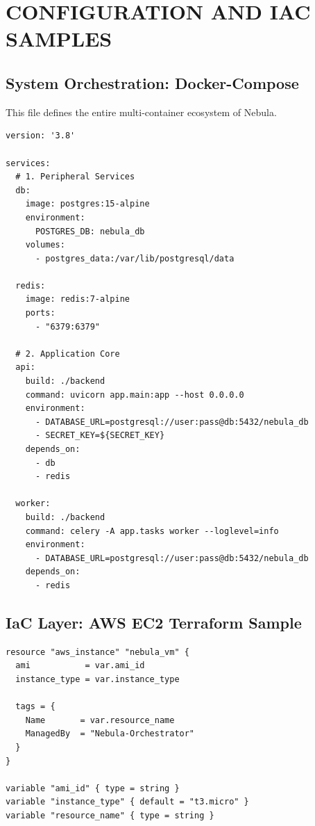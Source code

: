 \chapter{CONFIGURATION AND IAC SAMPLES}

\section{System Orchestration: Docker-Compose}
This file defines the entire multi-container ecosystem of Nebula.

\begin{lstlisting}[language=XML, caption=docker-compose.yml with Worker Cluster]
version: '3.8'

services:
  # 1. Peripheral Services
  db:
    image: postgres:15-alpine
    environment:
      POSTGRES_DB: nebula_db
    volumes:
      - postgres_data:/var/lib/postgresql/data

  redis:
    image: redis:7-alpine
    ports:
      - "6379:6379"

  # 2. Application Core
  api:
    build: ./backend
    command: uvicorn app.main:app --host 0.0.0.0
    environment:
      - DATABASE_URL=postgresql://user:pass@db:5432/nebula_db
      - SECRET_KEY=${SECRET_KEY}
    depends_on:
      - db
      - redis

  worker:
    build: ./backend
    command: celery -A app.tasks worker --loglevel=info
    environment:
      - DATABASE_URL=postgresql://user:pass@db:5432/nebula_db
    depends_on:
      - redis
\end{lstlisting}

\section{IaC Layer: AWS EC2 Terraform Sample}
\begin{lstlisting}[language=XML, caption=AWS VM Module (main.tf)]
resource "aws_instance" "nebula_vm" {
  ami           = var.ami_id
  instance_type = var.instance_type
  
  tags = {
    Name       = var.resource_name
    ManagedBy  = "Nebula-Orchestrator"
  }
}

variable "ami_id" { type = string }
variable "instance_type" { default = "t3.micro" }
variable "resource_name" { type = string }
\end{lstlisting}

